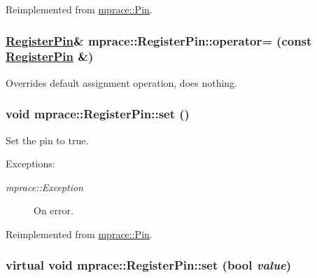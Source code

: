 Reimplemented from \hyperlink{classmprace_1_1Pin_a2}{mprace::Pin}.\hypertarget{classmprace_1_1RegisterPin_b1}{
\subsubsection[operator=]{\setlength{\rightskip}{0pt plus 5cm}\hyperlink{classmprace_1_1RegisterPin}{Register\-Pin}\& mprace::Register\-Pin::operator= (const \hyperlink{classmprace_1_1RegisterPin}{Register\-Pin} \&)}}
\label{classmprace_1_1RegisterPin_b1}


Overrides default assignment operation, does nothing. 

\hypertarget{classmprace_1_1RegisterPin_a4}{
\subsubsection[set]{\setlength{\rightskip}{0pt plus 5cm}void mprace::Register\-Pin::set ()}}
\label{classmprace_1_1RegisterPin_a4}


Set the pin to true. 

\begin{Desc}
\item[Exceptions:]
\begin{description}
\item[{\em mprace::Exception}]On error.\end{description}
\end{Desc}


Reimplemented from \hyperlink{classmprace_1_1Pin_a3}{mprace::Pin}.\hypertarget{classmprace_1_1RegisterPin_a2}{
\subsubsection[set]{\setlength{\rightskip}{0pt plus 5cm}virtual void mprace::Register\-Pin::set (bool {\em value})}}
\label{classmprace_1_1RegisterPin_a2}


